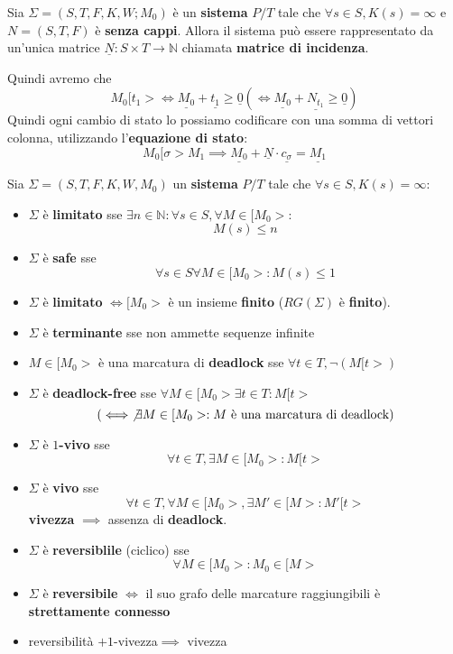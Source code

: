 \begin{definizione}
    Sia $\Sigma = (S,T,F,K,W;M_0)$ è un \textbf{sistema} $P/T$ tale che
    $\forall s\in S,K(s)=\infty$ e $N=(S,T,F)$ è \textbf{senza cappi}. Allora il
    sistema può essere rappresentato da un'unica matrice $\underline{N}:S\times
        T\rightarrow\mathbb{N}$
    chiamata \textbf{matrice di incidenza}.
\end{definizione}
Quindi avremo che
\begin{equation}
    M_0[t_1>\iff \underline{M_0}+\underline{t_1}\ge \underline{0} (\iff
    \underline{M_0}+\underline{N_{t_1}}\ge \underline{0})
\end{equation}
Quindi ogni cambio di stato lo possiamo codificare con una somma di vettori colonna,
utilizzando l'\textbf{equazione di stato}:
\begin{equation}
    M_0[\sigma>M_1\implies \underline{M_0}+\underline{N}\cdot \underline{c_\sigma}
    =\underline{M_1}
\end{equation}

\begin{osservazione}
    Sia $\Sigma = (S,T,F,K,W,M_0)$ un \textbf{sistema} $P/T$ tale che $\forall s
        \in S, K(s)=\infty$:
    \begin{itemize}
        \item $\Sigma$ è \textbf{limitato} sse $\exists n\in \mathbb{N}: \forall
                  s\in S, \forall M\in [M_0>$:
              $$M(s)\le n$$
        \item $\Sigma$ è \textbf{safe} sse $$\forall s\in S \forall M\in
                  [M_0>:M(s)\le 1$$
        \item
              $\Sigma$ è \textbf{limitato} $\iff [M_0>$ è un insieme \textbf{finito}
              ($RG(\Sigma)$ è \textbf{finito}).
        \item $\Sigma$ è \textbf{terminante} sse non ammette sequenze infinite
        \item $M\in [M_0>$ è una marcatura di \textbf{deadlock} sse $\forall t\in
                  T,\lnot(M[t>)$
        \item $\Sigma$ è \textbf{deadlock-free} sse $\forall M\in[M_0>\exists t\in
                  T:M[t>$
              $$(\iff \not\exists M\in [M_0>:M\text{ è una marcatura di deadlock})$$
        \item $\Sigma$ è $1$\textbf{-vivo} sse
              $$\forall t\in T,\exists M\in [M_0>:M[t>$$
        \item  $\Sigma$ è \textbf{vivo} sse
              $$\forall t\in T,\forall M\in [M_0>,\exists M'\in [M>:M'[t>$$
              \textbf{vivezza} $\implies$ assenza di \textbf{deadlock}.
        \item $\Sigma$ è \textbf{reversiblile} (ciclico) sse
              $$\forall M\in [M_0>:M_0\in [M>$$
        \item $\Sigma$ è \textbf{reversibile} $\iff$ il suo grafo delle marcature
              raggiungibili è \textbf{strettamente connesso}
        \item reversibilità $+ 1$-vivezza$\implies$ vivezza
    \end{itemize}
\end{osservazione}

